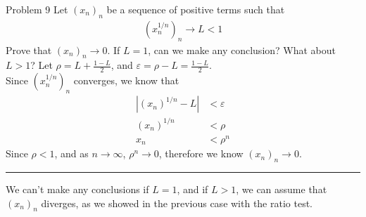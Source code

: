 \documentclass[10pt]{extarticle}
\begin{document}
  \begin{problem}{Problem 9}
    Let $(x_n)_n$ be a sequence of positive terms such that
    \begin{align*}
      \left(x_n^{1/n}\right)_n \rightarrow L < 1
    \end{align*}
    Prove that $(x_n)_n \rightarrow 0$. If $L = 1$, can we make any conclusion? What about $L > 1$?
    \tcblower
    Let $\rho = L + \frac{1-L}{2}$, and $\varepsilon = \rho - L = \frac{1-L}{2}$.\\

    Since $\left(x_n^{1/n}\right)_{n}$ converges, we know that
    \begin{align*}
      \left|(x_n)^{1/n} - L\right| &< \varepsilon \\
      \left(x_n\right)^{1/n} &< \rho\\
      x_n &< \rho^{n}
    \end{align*}
    Since $\rho < 1$, and as $n\rightarrow\infty$, $\rho^{n} \rightarrow 0$, therefore we know $\left(x_n\right)_n\rightarrow 0$.\\
    \vspace{4pt}
    \rule{\textwidth}{0.4pt}
    \vspace{4pt}
    We can't make any conclusions if $L = 1$, and if $L > 1$, we can assume that $(x_n)_n$ diverges, as we showed in the previous case with the ratio test.
  \end{problem}
\end{document}
